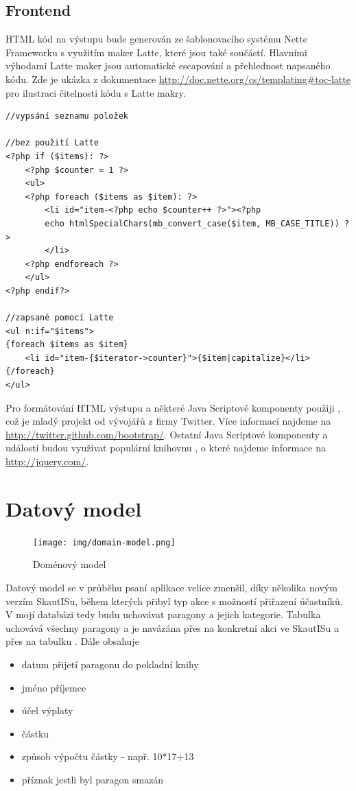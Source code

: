 \documentclass[thesis=B,czech]{FITthesis}[2011/06/14]
\begin{document}
\subsection{Frontend}
HTML kód na výstupu bude generován ze šablonovacího systému Nette Frameworku s využitím maker Latte, které jsou také součástí. Hlavními výhodami Latte maker jsou automatické escapování a přehlednost napsaného kódu. Zde je ukázka z dokumentace \url{http://doc.nette.org/cs/templating#toc-latte} pro ilustraci čitelnosti kódu s Latte makry. 

\begin{verbatim}
//vypsání seznamu položek

//bez použití Latte
<?php if ($items): ?>
    <?php $counter = 1 ?>
    <ul>
    <?php foreach ($items as $item): ?>
        <li id="item-<?php echo $counter++ ?>"><?php
        echo htmlSpecialChars(mb_convert_case($item, MB_CASE_TITLE)) ?>
        </li>
    <?php endforeach ?>
    </ul>
<?php endif?>

//zapsané pomocí Latte
<ul n:if="$items">
{foreach $items as $item}
    <li id="item-{$iterator->counter}">{$item|capitalize}</li>
{/foreach}
</ul>
\end{verbatim}

Pro formátování HTML výstupu a některé Java Scriptové komponenty použiji , což je mladý projekt od vývojářů z firmy Twitter. Více informací najdeme na \url{http://twitter.github.com/bootstrap/}. Ostatní Java Scriptové komponenty a události budou využívat populární knihovnu , o které najdeme informace na \url{http://jquery.com/}.

\section{Datový model}
\begin{figure}[h] \centering
 	\texttt{[image: img/domain-model.png]}
 	\caption[SkautIS]{Doménový model}\label{fig:domain-model}
\end{figure}
Datový model se v průběhu psaní aplikace velice zmenšil, díky několika novým verzím SkautISu, během kterých přibyl typ akce  s možností přiřazení účastníků. V mojí databázi tedy budu uchovávat paragony a jejich kategorie. 
Tabulka  uchovává všechny paragony a je navázána přes  na konkretní akci ve SkautISu a přes  na tabulku . Dále obsahuje 
 \begin{itemize}
 	\item datum přijetí paragonu do pokladní knihy
 	\item jméno příjemce
 	\item účel výplaty
 	\item částku
	\item způsob výpočtu částky - např. 10*17+13
	\item příznak jestli byl paragon smazán
\end{itemize} 
\end{document}
